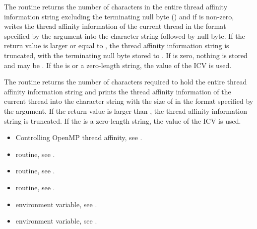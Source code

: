 \effect
\begin{ccppspecific}
The  routine returns the number of characters
in the entire thread affinity information string excluding the terminating
null byte () and if  is non-zero, writes the thread
affinity information of the current thread  in the format specified by the  argument
into the character string  followed by null byte.  If the return value is larger
or equal to , the thread affinity information string is truncated, with the terminating
null byte stored to {}.  If  is
zero, nothing is stored and  may be .
If the  is  or a zero-length string, the value of the
 ICV is used.
\end{ccppspecific}

\begin{fortranspecific}
The  routine returns the number of characters
required to hold the entire thread affinity information string
and prints the thread affinity information of the current thread
into the character string  with the size of
{} in the format specified by the  argument.
If the return value is larger than {}, the thread affinity
information string is truncated.
If the  is a zero-length string, the value of the  ICV is used.
\end{fortranspecific}

\crossreferences
\begin{itemize}
\item Controlling OpenMP thread affinity, see
.
\item {} routine, see .
\item {} routine, see .
\item {} routine, see .
\item {} environment variable, see
.
\item {} environment variable, see
.
\end{itemize}


